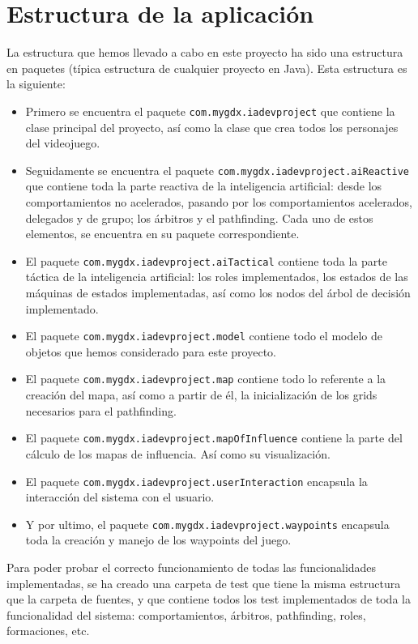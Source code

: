 \medskip
\section{Estructura de la aplicación}
La estructura que hemos llevado a cabo en este proyecto ha sido una estructura en paquetes (típica estructura de cualquier proyecto en Java). Esta estructura es la siguiente:
\begin{itemize}
 \item Primero se encuentra el paquete \texttt{com.mygdx.iadevproject} que contiene la clase principal del proyecto, así como la clase que crea todos los personajes del videojuego.
 \item Seguidamente se encuentra el paquete \texttt{com.mygdx.iadevproject.aiReactive} que contiene toda la parte reactiva de la inteligencia artificial: desde los comportamientos no acelerados, pasando por los comportamientos acelerados, delegados y de grupo; los árbitros y el pathfinding. Cada uno de estos elementos, se encuentra en su paquete correspondiente.
 \item El paquete \texttt{com.mygdx.iadevproject.aiTactical} contiene toda la parte táctica de la inteligencia artificial: los roles implementados, los estados de las máquinas de estados implementadas, así como los nodos del árbol de decisión implementado.
 \item El paquete \texttt{com.mygdx.iadevproject.model} contiene todo el modelo de objetos que hemos considerado para este proyecto.
 \item El paquete \texttt{com.mygdx.iadevproject.map} contiene todo lo referente a la creación del mapa, así como a partir de él, la inicialización de los grids necesarios para el pathfinding.
 \item El paquete \texttt{com.mygdx.iadevproject.mapOfInfluence} contiene la parte del cálculo de los mapas de influencia. Así como su visualización.
 \item El paquete \texttt{com.mygdx.iadevproject.userInteraction} encapsula la interacción del sistema con el usuario.
 \item Y por ultimo, el paquete \texttt{com.mygdx.iadevproject.waypoints} encapsula toda la creación y manejo de los waypoints del juego.
\end{itemize}

Para poder probar el correcto funcionamiento de todas las funcionalidades implementadas, se ha creado una carpeta de test que tiene la misma estructura que la carpeta de fuentes, y que contiene todos los test implementados de toda la funcionalidad del sistema: comportamientos, árbitros, pathfinding, roles, formaciones, etc.